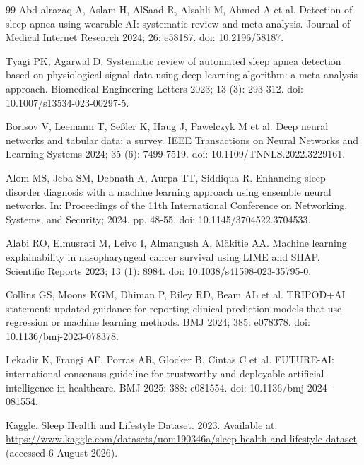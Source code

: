 \documentclass{turkjour}%
\begin{document}
\begin{thebibliography}{99}
Abd-alrazaq A, Aslam H, AlSaad R, Alsahli M, Ahmed A et al. Detection of sleep apnea using wearable AI: systematic review and meta-analysis. Journal of Medical Internet Research 2024; 26: e58187. doi: 10.2196/58187.

Tyagi PK, Agarwal D. Systematic review of automated sleep apnea detection based on physiological signal data using deep learning algorithm: a meta-analysis approach. Biomedical Engineering Letters 2023; 13 (3): 293-312. doi: 10.1007/s13534-023-00297-5.

Borisov V, Leemann T, Se\ss ler K, Haug J, Pawelczyk M et al. Deep neural networks and tabular data: a survey. IEEE Transactions on Neural Networks and Learning Systems 2024; 35 (6): 7499-7519. doi: 10.1109/TNNLS.2022.3229161.

Alom MS, Jeba SM, Debnath A, Aurpa TT, Siddiqua R. Enhancing sleep disorder diagnosis with a machine learning approach using ensemble neural networks. In: Proceedings of the 11th International Conference on Networking, Systems, and Security; 2024. pp. 48-55. doi: 10.1145/3704522.3704533.

Alabi RO, Elmusrati M, Leivo I, Almangush A, M\"{a}kitie AA. Machine learning explainability in nasopharyngeal cancer survival using LIME and SHAP. Scientific Reports 2023; 13 (1): 8984. doi: 10.1038/s41598-023-35795-0.

Collins GS, Moons KGM, Dhiman P, Riley RD, Beam AL et al. TRIPOD+AI statement: updated guidance for reporting clinical prediction models that use regression or machine learning methods. BMJ 2024; 385: e078378. doi: 10.1136/bmj-2023-078378.

Lekadir K, Frangi AF, Porras AR, Glocker B, Cintas C et al. FUTURE-AI: international consensus guideline for trustworthy and deployable artificial intelligence in healthcare. BMJ 2025; 388: e081554. doi: 10.1136/bmj-2024-081554.

Kaggle. Sleep Health and Lifestyle Dataset. 2023. Available at: \url{https://www.kaggle.com/datasets/uom190346a/sleep-health-and-lifestyle-dataset} (accessed 6 August 2026).

\end{thebibliography}
\end{document}
